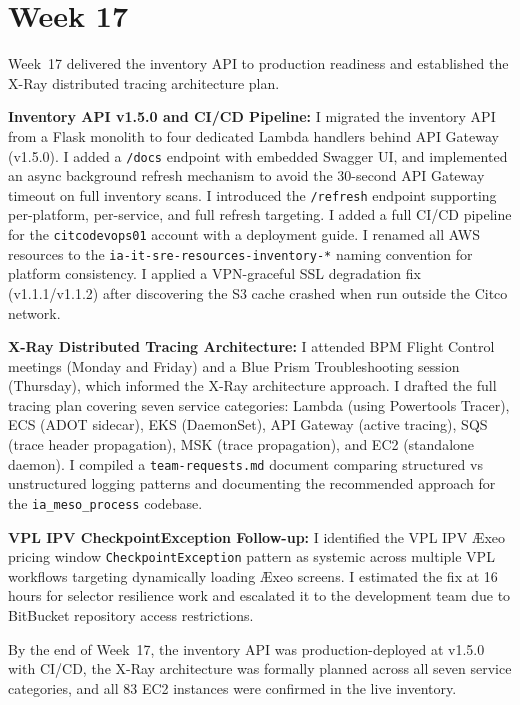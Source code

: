 
\FloatBarrier

\section{Week 17}
\label{sec:week17}

Week~17 delivered the inventory API to production readiness and established
the X-Ray distributed tracing architecture plan.

\textbf{Inventory API v1.5.0 and CI/CD Pipeline:} 
I migrated the inventory API from a Flask monolith to four dedicated Lambda
handlers behind API Gateway (v1.5.0). I added a \texttt{/docs} endpoint
with embedded Swagger UI, and implemented an async background refresh
mechanism to avoid the 30-second API Gateway timeout on full inventory
scans. I introduced the \texttt{/refresh} endpoint supporting per-platform,
per-service, and full refresh targeting. I added a full CI/CD pipeline for
the \texttt{citcodevops01} account with a deployment guide. I renamed all AWS
resources to the \texttt{ia-it-sre-resources-inventory-*}
naming convention for platform consistency. I applied a VPN-graceful SSL degradation
fix (v1.1.1/v1.1.2) after discovering the S3 cache crashed
when run outside the Citco network.

\textbf{X-Ray Distributed Tracing Architecture:} 
I attended BPM Flight Control meetings (Monday and Friday) and a Blue Prism Troubleshooting session
(Thursday), which informed the X-Ray architecture approach. I drafted the full
tracing plan covering seven service categories: Lambda (using Powertools Tracer),
ECS (ADOT sidecar), EKS (DaemonSet), API Gateway (active tracing), 
SQS (trace header propagation), MSK (trace propagation), 
and EC2 (standalone daemon). I compiled a \texttt{team-requests.md} document comparing structured vs unstructured
logging patterns and documenting the recommended approach for the
\texttt{ia\_meso\_process} codebase.

\textbf{VPL IPV CheckpointException Follow-up:} 
I identified the VPL IPV
\AE xeo pricing window \texttt{CheckpointException} pattern as
systemic across multiple VPL workflows targeting dynamically loading \AE xeo
screens. I estimated the fix at 16 hours for selector resilience work and
escalated it to the development team due to BitBucket repository access restrictions.

By the end of Week~17, the inventory API was production-deployed at v1.5.0
with CI/CD, the X-Ray architecture was formally planned across all seven service categories,
and all 83 EC2 instances were confirmed in the live inventory.

